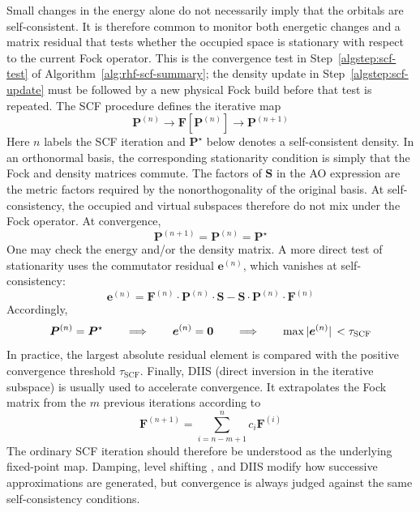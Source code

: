 \documentclass[11pt,a4paper,titlepage]{article}
\numberwithin{equation}{section}
\newcommand{\be}{\boldsymbol{e}}
\newcommand{\bF}{\boldsymbol{F}}
\newcommand{\bO}{\boldsymbol{0}}
\newcommand{\bP}{\boldsymbol{P}}
\newcommand{\bS}{\boldsymbol{S}}
\begin{document}
Small changes in the energy alone do not necessarily imply that the orbitals
are self-consistent. It is therefore common to monitor both energetic changes
and a matrix residual that tests whether the occupied space is stationary
with respect to the current Fock operator.
This is the convergence test in Step~\ref{algstep:scf-test} of
Algorithm~\ref{alg:rhf-scf-summary}; the density update in
Step~\ref{algstep:scf-update} must be followed by a new physical Fock build
before that test is repeated.
The SCF procedure defines the iterative map
\begin{equation}
    \bP^{(n)}
    \longrightarrow\bF[\bP^{(n)}]
    \longrightarrow\bP^{(n+1)}
\end{equation}
Here $n$ labels the SCF iteration and $\bP^\star$ below denotes a
self-consistent density. In an orthonormal basis, the corresponding
stationarity condition is simply that the Fock
and density matrices commute. The factors of $\bS$ in the AO expression are
the metric factors required by the nonorthogonality of the original basis.
At self-consistency, the occupied and virtual subspaces therefore do not mix
under the Fock operator.
At convergence,
\begin{equation}
  \bP^{(n+1)}=\bP^{(n)}=\bP^\star
\end{equation}
One may check the energy and/or the density matrix. A more direct test of
stationarity uses the commutator residual $\be^{(n)}$, which vanishes at
self-consistency:
\begin{equation}
  \boxed{
    \be^{(n)}
    =\bF^{(n)}\cdot\bP^{(n)}\cdot\bS
    -\bS\cdot\bP^{(n)}\cdot\bF^{(n)}
  }
\end{equation}
Accordingly,
\begin{equation}
  \bP^{(n)}=\bP^\star
  \qquad\Longrightarrow\qquad
  \be^{(n)}=\bO
  \qquad\Longrightarrow\qquad
  \max\abs*{\be^{(n)}}<\tau_\text{SCF}
\end{equation}
In practice, the largest absolute residual element is compared with the
positive convergence threshold $\tau_\text{SCF}$.
Finally, DIIS (direct inversion in the iterative subspace) is usually
used to accelerate convergence. It extrapolates the Fock matrix from the
$m$ previous iterations according to
\begin{equation}
    \bF^{(n+1)}=\sum_{i=n-m+1}^{n}c_i\bF^{(i)}
\end{equation}
The ordinary SCF iteration should therefore be understood as the underlying
fixed-point map. Damping, level shifting \citep{SaundersHillier1973}, and DIIS modify how successive
approximations are generated, but convergence is always judged against the
same self-consistency conditions.
\end{document}
